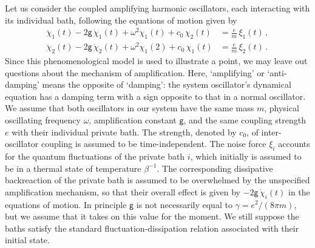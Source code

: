 \documentclass[11pt,a4paper]{article}
\begin{document}
 
 Let us consider the coupled amplifying harmonic oscillators, each interacting with its individual bath, following the equations of motion given by
\begin{align}
	\ddot{\chi}_{1}(t)-2\mathsf{g}\,\dot{\chi}_{1}(t)+\omega^{2}\chi_{1}(t)+c_{0}\,\chi_{2}(t)&=\frac{e}{m}\,\xi_{1}(t)\,,\label{E:eotugbsd1}\\
	\ddot{\chi}_{2}(t)-2\mathsf{g}\,\dot{\chi}_{2}(t)+\omega^{2}\chi_{1}(2)+c_{0}\,\chi_{1}(t)&=\frac{e}{m}\,\xi_{2}(t)\,.\label{E:eotugbsd2}
\end{align}
Since this phenomenological model is used to illustrate a point, we may leave out questions about the mechanism of amplification. Here, `amplifying' or `anti-damping'  means the opposite of `damping': the system oscillator's dynamical equation has a damping term with a sign opposite to that in a normal oscillator. We assume that both oscillators in our system have the same mass $m$, physical oscillating frequency $\omega$, amplification constant $\mathsf{g}$, and the same coupling strength $e$ with their individual private bath. The strength, denoted by $c_{0}$, of inter-oscillator coupling is assumed to be time-independent.  The noise force $\xi_{i}$ accounts for the quantum fluctuations of the private bath $i$, which initially is assumed to be in a thermal state of temperature $\beta^{-1}$. The corresponding dissipative backreaction of the private bath is assumed to be overwhelmed by the unspecified amplification mechanism, so that their overall effect is given by $-2\mathsf{g}\,\dot{\chi}_{i}(t)$ in the equations of motion. In principle $\mathsf{g}$ is not necessarily equal to $\gamma=e^{2}/(8\pi m)$, but we assume that it takes on this value for the moment. We still suppose the baths satisfy the standard fluctuation-dissipation relation associated with their initial state. 
\end{document}
